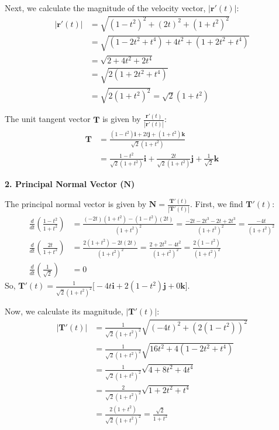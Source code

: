 \documentclass[12pt,a4paper]{article}
\begin{document}
\begin{enumerate}
\begin{tcolorbox}[enhanced,breakable,ansbox,colback=cD!4,colframe=cD,boxrule=0.8pt,arc=5pt,title={\textbf{Answer}},fonttitle=\bfseries\color{white},colbacktitle=cD]
Next, we calculate the magnitude of the velocity vector, $|\mathbf{r}'(t)|$:
\begin{align*}
    |\mathbf{r}'(t)| &= \sqrt{(1 - t^2)^2 + (2t)^2 + (1 + t^2)^2} \\
    &= \sqrt{(1 - 2t^2 + t^4) + 4t^2 + (1 + 2t^2 + t^4)} \\
    &= \sqrt{2 + 4t^2 + 2t^4} \\
    &= \sqrt{2(1 + 2t^2 + t^4)} \\
    &= \sqrt{2(1 + t^2)^2} = \sqrt{2}(1 + t^2)
\end{align*}

The unit tangent vector $\mathbf{T}$ is given by $\frac{\mathbf{r}'(t)}{|\mathbf{r}'(t)|}$:
\begin{align*}
    \mathbf{T} &= \frac{(1 - t^2)\mathbf{i} + 2t\mathbf{j} + (1 + t^2)\mathbf{k}}{\sqrt{2}(1 + t^2)} \\
    &= \boxed{\frac{1 - t^2}{\sqrt{2}(1 + t^2)}\mathbf{i} + \frac{2t}{\sqrt{2}(1 + t^2)}\mathbf{j} + \frac{1}{\sqrt{2}}\mathbf{k}}
\end{align*}

\vspace{1em}
\textbf{2. Principal Normal Vector ($\mathbf{N}$)}

The principal normal vector is given by $\mathbf{N} = \frac{\mathbf{T}'(t)}{|\mathbf{T}'(t)|}$. First, we find $\mathbf{T}'(t)$:
\begin{align*}
    \frac{d}{dt}\left(\frac{1 - t^2}{1 + t^2}\right) &= \frac{(-2t)(1 + t^2) - (1 - t^2)(2t)}{(1 + t^2)^2} = \frac{-2t - 2t^3 - 2t + 2t^3}{(1 + t^2)^2} = \frac{-4t}{(1 + t^2)^2} \\[1ex]
    \frac{d}{dt}\left(\frac{2t}{1 + t^2}\right) &= \frac{2(1 + t^2) - 2t(2t)}{(1 + t^2)^2} = \frac{2 + 2t^2 - 4t^2}{(1 + t^2)^2} = \frac{2(1 - t^2)}{(1 + t^2)^2} \\[1ex]
    \frac{d}{dt}\left(\frac{1}{\sqrt{2}}\right) &= 0
\end{align*}
So, $\mathbf{T}'(t) = \frac{1}{\sqrt{2}(1 + t^2)^2} \big[ -4t\mathbf{i} + 2(1 - t^2)\mathbf{j} + 0\mathbf{k} \big]$.

Now, we calculate its magnitude, $|\mathbf{T}'(t)|$:
\begin{align*}
    |\mathbf{T}'(t)| &= \frac{1}{\sqrt{2}(1 + t^2)^2} \sqrt{(-4t)^2 + (2(1 - t^2))^2} \\
    &= \frac{1}{\sqrt{2}(1 + t^2)^2} \sqrt{16t^2 + 4(1 - 2t^2 + t^4)} \\
    &= \frac{1}{\sqrt{2}(1 + t^2)^2} \sqrt{4 + 8t^2 + 4t^4} \\
    &= \frac{2}{\sqrt{2}(1 + t^2)^2} \sqrt{1 + 2t^2 + t^4} \\
    &= \frac{2(1 + t^2)}{\sqrt{2}(1 + t^2)^2} = \frac{\sqrt{2}}{1 + t^2}
\end{align*}


\end{tcolorbox}
\end{enumerate}
\end{document}
